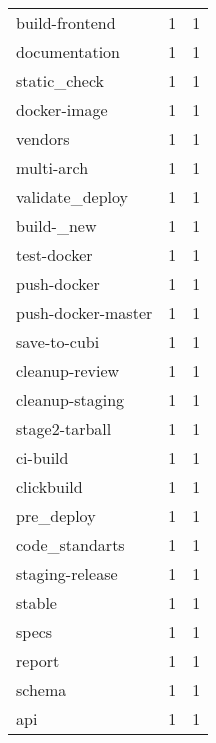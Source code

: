 \begin{tabular}{lrr}
build-frontend             &                   1 &             1 \\
documentation              &                   1 &             1 \\
static\_check               &                   1 &             1 \\
docker-image               &                   1 &             1 \\
vendors                    &                   1 &             1 \\
multi-arch                 &                   1 &             1 \\
validate\_deploy            &                   1 &             1 \\
build-\_new                 &                   1 &             1 \\
test-docker                &                   1 &             1 \\
push-docker                &                   1 &             1 \\
push-docker-master         &                   1 &             1 \\
save-to-cubi               &                   1 &             1 \\
cleanup-review             &                   1 &             1 \\
cleanup-staging            &                   1 &             1 \\
stage2-tarball             &                   1 &             1 \\
ci-build                   &                   1 &             1 \\
clickbuild                 &                   1 &             1 \\
pre\_deploy                 &                   1 &             1 \\
code\_standarts             &                   1 &             1 \\
staging-release            &                   1 &             1 \\
stable                     &                   1 &             1 \\
specs                      &                   1 &             1 \\
report                     &                   1 &             1 \\
schema                     &                   1 &             1 \\
api                        &                   1 &             1 \\

\end{tabular}
